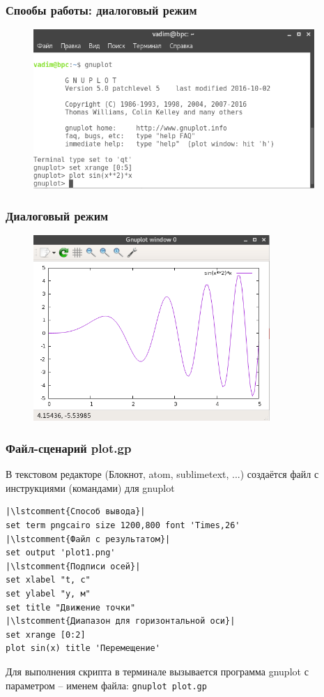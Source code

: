\documentclass[12pt, compress]{beamer}
\newcommand{\code}[1]{\textcolor{dark-green}{\texttt{#1}}}
\newcommand{\lstcomment}[1]{\textcolor{dark-green}{\# \texttt{#1}}}
\begin{document}
\begin{frame}[c]
\frametitle{Спообы работы: диалоговый режим}
\begin{figure}[htbp]
	\centering
	\includegraphics[width=0.95\textwidth]{simple_command.png}
\end{figure}
\end{frame}
 
\begin{frame}[c]
\frametitle{Диалоговый режим}
\begin{figure}[htbp]
	\centering
	\includegraphics[width=0.8\textwidth]{simple_command_result.png}
\end{figure}
\end{frame}


\begin{frame}[c,fragile]
\frametitle{Файл-сценарий plot.gp}
В текстовом редакторе (Блокнот, atom, sublimetext, ...) создаётся файл с инструкциями (командами) для gnuplot
\begin{lstlisting}
|\lstcomment{Способ вывода}|
set term pngcairo size 1200,800 font 'Times,26'
|\lstcomment{Файл с результатом}|
set output 'plot1.png'
|\lstcomment{Подписи осей}|
set xlabel "t, c"
set ylabel "y, м"
set title "Движение точки"
|\lstcomment{Диапазон для горизонтальной оси}|
set xrange [0:2]
plot sin(x) title 'Перемещение'
\end{lstlisting}
Для выполнения скрипта в терминале вызывается программа gnuplot с параметром -- именем файла: \code{gnuplot plot.gp}
\end{frame}
\end{document}
